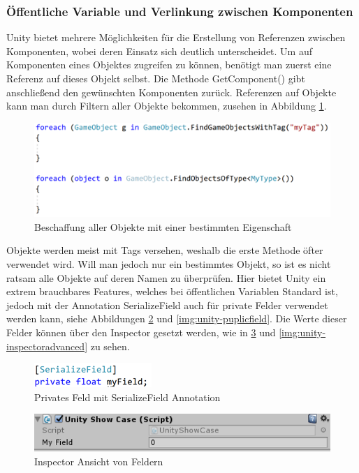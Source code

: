 \subsubsection{Öffentliche Variable und Verlinkung zwischen Komponenten}
Unity bietet mehrere Möglichkeiten für die Erstellung von Referenzen zwischen Komponenten, wobei deren Einsatz sich deutlich unterscheidet.
Um auf Komponenten eines Objektes zugreifen zu können, benötigt man zuerst eine Referenz auf dieses Objekt selbst. Die Methode GetComponent() gibt anschließend den gewünschten Komponenten zurück. Referenzen auf Objekte kann man durch Filtern aller Objekte bekommen, zusehen in Abbildung \ref{img:unity-getallobjects}.
\begin{figure}
    \includegraphics[scale=0.8]{images/unityGetAllObjects.png}
    \caption{Beschaffung aller Objekte mit einer bestimmten Eigenschaft}
    \label{img:unity-getallobjects}
\end{figure}
Objekte werden meist mit Tags versehen, weshalb die erste Methode öfter verwendet wird. Will man jedoch nur ein bestimmtes Objekt, so ist es nicht ratsam alle Objekte auf deren Namen zu überprüfen. Hier bietet Unity ein extrem brauchbares Features, welches bei öffentlichen Variablen Standard ist, jedoch mit der Annotation SerializeField auch für private Felder verwendet werden kann, siehe Abbildungen \ref{img:unity-serializefield} und \ref{img:unity-puplicfield}. Die Werte dieser Felder können über den Inspector gesetzt werden, wie in \ref{img:unity-inspectorsimple} und \ref{img:unity-inspectoradvanced} zu sehen.
\begin{figure}
    \includegraphics[scale=0.8]{images/unitySerializeField.png}
    \caption{Privates Feld mit SerializeField Annotation}
    \label{img:unity-serializefield}
\end{figure}
\begin{figure}
    \includegraphics[scale=0.8]{images/unityInspectorSimple.png}
    \caption{Inspector Ansicht von Feldern}
    \label{img:unity-inspectorsimple}
\end{figure}

